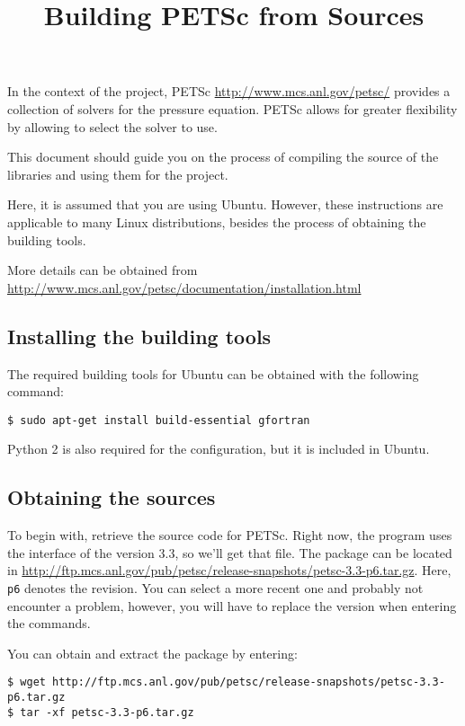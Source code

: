 \documentclass[a4paper]{article}
\begin{document}
\title{Building PETSc from Sources}
\maketitle

In the context of the project, PETSc \url{http://www.mcs.anl.gov/petsc/} provides a collection of 
solvers for the pressure equation. PETSc allows for greater flexibility by allowing to select the
solver to use.

This document should guide you on the process of compiling the source of the libraries and using
them for the project.

Here, it is assumed that you are using Ubuntu. However, these instructions are applicable to many
Linux distributions, besides the process of obtaining the building tools.

More details can be obtained from \url{http://www.mcs.anl.gov/petsc/documentation/installation.html}

\subsection*{Installing the building tools}

The required building tools for Ubuntu can be obtained with the following command:

\begin{lstlisting}
$ sudo apt-get install build-essential gfortran
\end{lstlisting}

Python 2 is also required for the configuration, but it is included in Ubuntu.

\subsection*{Obtaining the sources}

To begin with, retrieve the source code for PETSc. Right now, the program uses the interface of
the version 3.3, so we'll get that file. The package can be located in
\url{http://ftp.mcs.anl.gov/pub/petsc/release-snapshots/petsc-3.3-p6.tar.gz}. Here, \texttt{p6}
denotes the revision. You can select a more recent one and probably not encounter a problem,
however, you will have to replace the version when entering the commands.

You can obtain and extract the package by entering:

\begin{lstlisting}
$ wget http://ftp.mcs.anl.gov/pub/petsc/release-snapshots/petsc-3.3-p6.tar.gz
$ tar -xf petsc-3.3-p6.tar.gz
\end{lstlisting}
\end{document}
